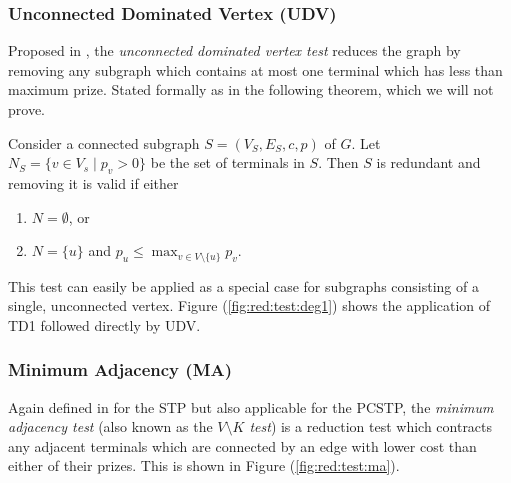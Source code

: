\subsubsection{Unconnected Dominated Vertex (UDV)}\label{sec:pre:udv}
Proposed in \cite{rehfeldt2016reduction}, the \textit{unconnected dominated vertex test} reduces the
graph by removing any subgraph which contains at most one terminal which has less than maximum prize.
Stated formally as in the following theorem, which we will not prove.
\begin{theorem}
  Consider a connected subgraph $S = (V_S, E_S, c, p)$ of $G$. Let $N_S = \{v \in V_s \mid p_v > 0\}$
  be the set of terminals in $S$. Then $S$ is redundant and removing it is valid if either
  \begin{enumerate}
  \item $N = \emptyset$, or
  \item $N = \{u\}$ and $p_u \leq \max_{v \in V \setminus \{u\}} p_v$.
  \end{enumerate}
\end{theorem}


This test can easily be applied as a special case for subgraphs consisting of a single,
 unconnected vertex.
 Figure (\ref{fig:red:test:deg1}) shows the application
 of TD1 followed directly by UDV.

\subsubsection{Minimum Adjacency (MA)}
Again defined in \cite{duin1989reduction} for the STP but also applicable for the PCSTP,
the \textit{minimum adjacency test}
(also known as the \textit{$V \setminus K$ test}) 
is a reduction test which contracts any adjacent
terminals which are connected by an edge with lower cost than either of their prizes.
 This is shown in Figure (\ref{fig:red:test:ma}).
 

